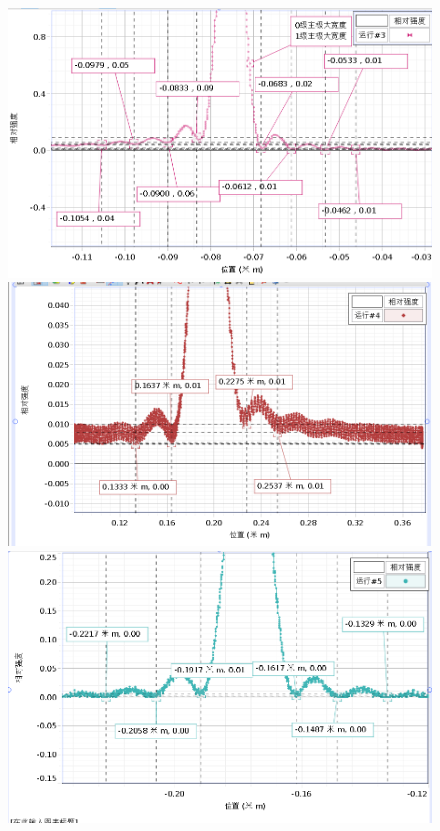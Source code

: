 \documentclass[a4paper]{../phyreport}
\begin{document}
\begin{figure}[H]
  \centering
  \begin{minipage}[b]{0.45\linewidth}
    \centering
\includegraphics[width=0.9\linewidth]{fig/单峰/0.02.png}
  \end{minipage}
  \begin{minipage}[b]{0.45\linewidth}
    \centering
\includegraphics[width=0.9\linewidth]{fig/单峰/0.04.png}
  \end{minipage}
  \begin{minipage}[b]{0.45\linewidth}
    \centering
\includegraphics[width=0.9\linewidth]{fig/单峰/0.08.png}

\end{minipage}
\end{figure}
\end{document}
